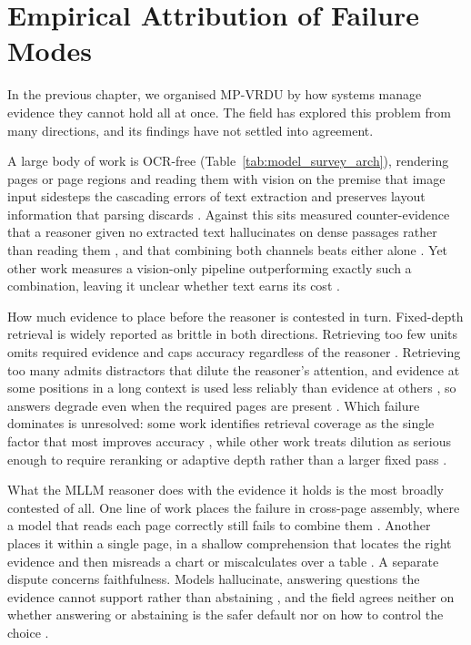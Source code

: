 \chapter{Empirical Attribution of Failure Modes}
\label{ch:empirical}



In the previous chapter, we organised MP-VRDU by how systems manage evidence they cannot hold all at once. The field has explored this problem from many directions, and its findings have not settled into agreement. 

A large body of work is OCR-free (Table~\ref{tab:model_survey_arch}), rendering pages or page regions and reading them with vision on the premise that image input sidesteps the cascading errors of text extraction and preserves layout information that parsing discards \citep{tanaka2025vdocrag, zheng2026doc, cho2024m3docrag}. Against this sits measured counter-evidence that a reasoner given no extracted text hallucinates on dense passages rather than reading them \citep{hannan2026docslm}, and that combining both channels beats either alone \citep{han2025mdocagent, suri2025visdom}. Yet other work measures a vision-only pipeline outperforming exactly such a combination, leaving it unclear whether text earns its cost \citep{liu2025resolving}.

How much evidence to place before the reasoner is contested in turn. Fixed-depth retrieval is widely reported as brittle in both directions. Retrieving too few units omits required evidence and caps accuracy regardless of the reasoner \citep{yan2026docseeker, li2026avir}. Retrieving too many admits distractors that dilute the reasoner's attention, and evidence at some positions in a long context is used less reliably than evidence at others \citep{liu2024lost, wang2024needle}, so answers degrade even when the required pages are present \citep{pez2025enhancing, yan2026docseeker}. Which failure dominates is unresolved: some work identifies retrieval coverage as the single factor that most improves accuracy \citep{liu2025resolving, zhu2026doclens}, while other work treats dilution as serious enough to require reranking or adaptive depth rather than a larger fixed pass \citep{li2026avir, pez2025enhancing}.

What the MLLM reasoner does with the evidence it holds is the most broadly contested of all. One line of work places the failure in cross-page assembly, where a model that reads each page correctly still fails to combine them \citep{zheng2026doc}. Another places it within a single page, in a shallow comprehension that locates the right evidence and then misreads a chart or miscalculates over a table \citep{guo2026end}. A separate dispute concerns faithfulness. Models hallucinate, answering questions the evidence cannot support rather than abstaining \citep{landeghem2023document, zhang2025dream}, and the field agrees neither on whether answering or abstaining is the safer default nor on how to control the choice \citep{ma2024mmlongbench}.

